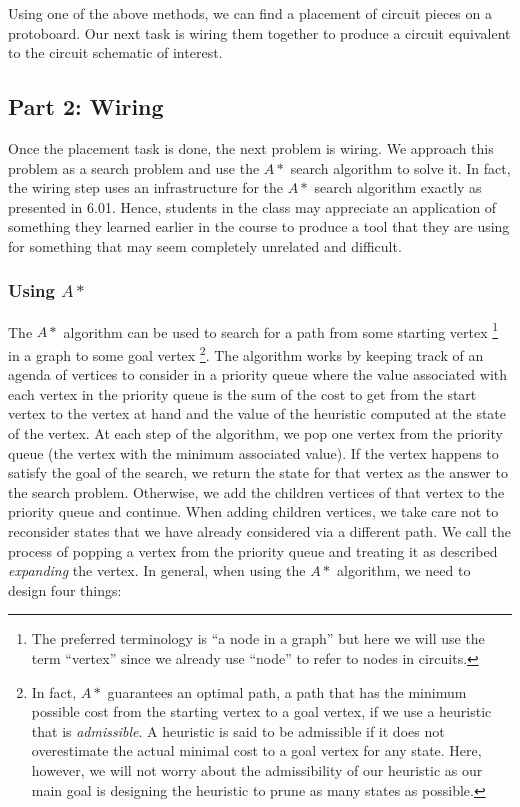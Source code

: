 Using one of the above methods, we can find a placement of circuit pieces on a
protoboard. Our next task is wiring them together to produce a circuit
equivalent to the circuit schematic of interest.

\subsection{Part 2: Wiring}

Once the placement task is done, the next problem is wiring.
We approach this problem as a search problem and use the $A*$ search algorithm to
solve it. In fact, the wiring step uses an infrastructure for the $A*$ search
algorithm exactly as presented in 6.01. Hence, students in
the class may appreciate an application of something they learned
earlier in the course to produce a tool that they are using for something that
may seem completely unrelated and difficult.

\subsubsection{Using $A*$}

The $A*$ algorithm can be used to search for a path from some starting vertex
\footnote{The preferred terminology is ``a node in a graph'' but here we will
use the term ``vertex'' since we already use ``node'' to refer to nodes in
circuits.} in
a graph to some goal vertex \footnote{In fact, $A*$ guarantees an optimal path, a
path that has the minimum possible cost from the starting vertex to a goal
vertex, if we use a heuristic that is \emph{admissible}. A heuristic is said to
be admissible if it does not overestimate the actual minimal cost to a goal
vertex
for any state. Here, however, we will not worry about the admissibility of our
heuristic as our main goal is designing the heuristic to prune as many states as
possible.}. The algorithm works by keeping track of an agenda
of vertices to consider
in a priority queue where the value associated with each vertex in the priority
queue is the sum of the cost to get from the start vertex to the vertex at hand
and the value of the heuristic
computed at the state of the vertex. At each step of the algorithm, we pop
one vertex from the priority queue (the vertex with the minimum associated
value). If the vertex happens to satisfy the goal of
the search, we return the state for that vertex as the answer to the search
problem. Otherwise, we add the children vertices of that vertex to the priority
queue and continue. When adding children vertices, we take care not to reconsider
states that we have already considered via a different path. We call the process
of popping a vertex from the priority queue and treating it as described
\emph{expanding} the vertex.
In general, when using the $A*$ algorithm, we need to design four things:

